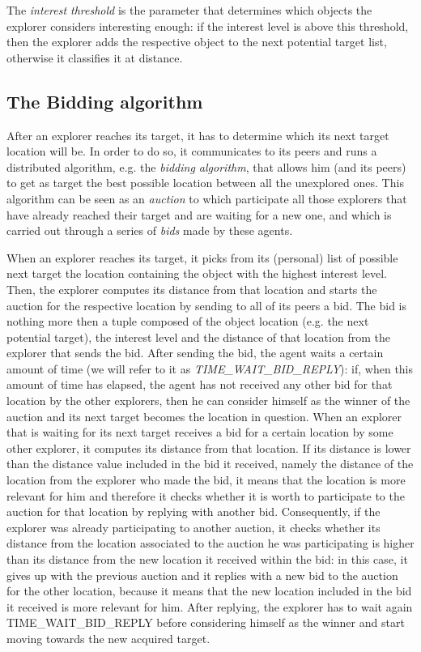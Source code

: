 \documentclass[a4paper, 10pt, conference]{ieeeconf}      %
\begin{document}
The \emph{interest threshold} is the parameter that determines which objects the explorer considers interesting enough: if the interest level is above this threshold, then the explorer adds the respective object to the next potential target list, otherwise it classifies it at distance. 




\subsection{The Bidding algorithm}\label{sec:bidding-algorithm}
After an explorer reaches its target, it has to determine which its next target location will be. In order to do so, it communicates to its peers and runs a distributed algorithm, e.g. the \emph{bidding algorithm}, that allows him (and its peers) to get as target the best possible location between all the unexplored ones. This algorithm can be seen as an \emph{auction} to which participate all those explorers that have already reached their target and are waiting for a new one, and which is carried out through a series of \emph{bids} made by these agents.  

When an explorer reaches its target, it picks from its (personal) list of possible next target the location containing the object with the highest interest level. Then, the explorer computes its distance from that location and starts the auction for the respective location by sending to all of its peers a bid. The bid is nothing more then a tuple composed of the object location (e.g. the next potential target), the interest level and the distance of that location from the explorer that sends the bid. After sending the bid, the agent waits a certain amount of time (we will refer to it as \emph{TIME\_WAIT\_BID\_REPLY}): if, when this amount of time has elapsed, the agent has not received any other bid for that location by the other explorers, then he can consider himself as the winner of the auction and its next target becomes the location in question. 
When an explorer that is waiting for its next target receives a bid for a certain location by some other explorer, it computes its distance from that location. If its distance is lower than the distance value included in the bid it received, namely the distance of the location from the explorer who made the bid, it means that the location is more relevant for him and therefore it checks whether it is worth to participate to the auction for that location by replying with another bid. Consequently, if the explorer was already participating to another auction, it checks whether its distance from the location associated to the auction he was participating is higher than its distance from the new location it received within the bid: in this case, it gives up with the previous auction and it replies with a new bid to the auction for the other location, because it means that the new location included in the bid it received is more relevant for him. After replying, the explorer has to wait again TIME\_WAIT\_BID\_REPLY before considering himself as the winner and start moving towards the new acquired target.
\end{document}
